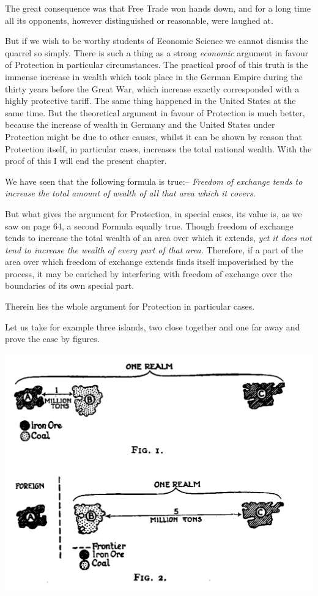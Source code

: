 \documentclass{book}
\begin{document}
The great consequence was that Free Trade won hands down, and for a long time all its opponents, however distinguished or reasonable, were laughed at.

But if we wish to be worthy students of Economic Science we cannot dismiss the quarrel so simply. There is such a thing as a strong \emph{economic} argument in favour of Protection in particular circumstances. The practical proof of this truth is the immense increase in wealth which took place in the German Empire during the thirty years before the Great War, which increase exactly corresponded with a highly protective tariff. The same thing happened in the United States at the same time. But the theoretical argument in favour of Protection is much better, because the increase of wealth in Germany and the United States under Protection might be due to other causes, whilst it can be shown by reason that Protection itself, in particular cases, increases the total national wealth. With the proof of this I will end the present chapter.

We have seen that the following formula is true:– \emph{Freedom of exchange tends to increase the total amount of wealth of all that area which it covers.}

But what gives the argument for Protection, in special cases, its value is, as we saw on page 64, a second Formula equally true. Though freedom of exchange tends to increase the total wealth of an area over which it extends, \emph{yet it does not tend to increase the wealth of every part of that area.} Therefore, if a part of the area over which freedom of exchange extends finds itself impoverished by the process, it may be enriched by interfering with freedom of exchange over the boundaries of its own special part.

Therein lies the whole argument for Protection in particular cases.

Let us take for example three islands, two close together and one far away and prove the case by figures.

\begin{center}
	\includegraphics[width=0.8\linewidth]{assets/ThreeRegions.png}
\end{center}
\end{document}
